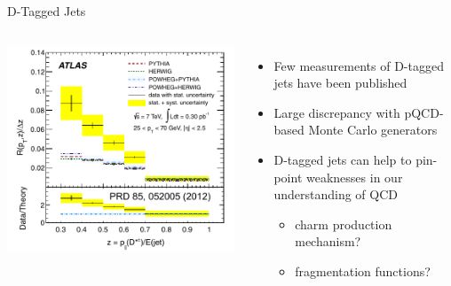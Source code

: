 \documentclass{beamer}
\begin{document}
\begin{frame}{D-Tagged Jets}
\begin{columns}
\includegraphics[width=\textwidth]{img/ATLAS_DStarJets}

\begin{itemize}
\item \alert{Few measurements} of D-tagged jets have been published
\item \alert{Large discrepancy} with pQCD-based Monte Carlo generators
\item D-tagged jets can help to pin-point weaknesses in our understanding of QCD
\begin{itemize}
\item charm production mechanism?
\item fragmentation functions?
\end{itemize}
\end{itemize}
\end{columns}
\end{frame}
\end{document}
